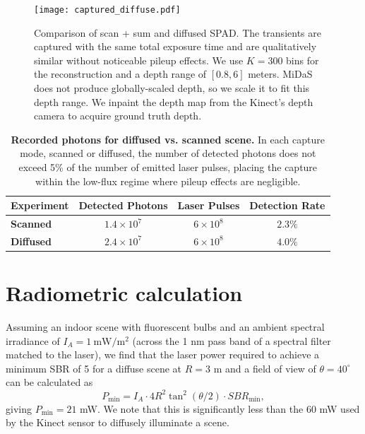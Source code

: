 \documentclass[runningheads]{llncs}
\begin{document}
\begin{figure}[ht!]
  \centering \texttt{[image: captured\_diffuse.pdf]}
  \caption{Comparison of scan + sum and diffused SPAD. The transients are captured
      with the same total exposure time and are qualitatively similar without 
      noticeable pileup effects. We use $K = 300$ bins for the reconstruction
      and a depth range of $[0.8, 6]$ meters. MiDaS \cite{Lasinger:2019} does
      not produce globally-scaled depth, so we scale it to fit this depth range.
      We inpaint the depth map from the Kinect's depth camera to acquire ground
      truth depth.}
  \label{fig:comparison}
\end{figure}

\begin{table}[ht!]
    \renewcommand{\arraystretch}{1.3}
    \setlength{\tabcolsep}{10pt}
     \centering
     \begin{tabular}{lccc} \toprule
         \textbf{Experiment} & \textbf{Detected Photons} & \textbf{Laser Pulses} & \textbf{Detection Rate} \\\hline
         \textbf{Scanned} & $1.4\times10^7$ & $6\times10^8$ & $2.3\%$ \\
         \textbf{Diffused} & $2.4\times10^7$ & $6\times10^8$ & $4.0\%$ \\
        \bottomrule
    \end{tabular}
    \vspace{0.4em}
    \caption{\textbf{Recorded photons for diffused vs. scanned scene.} In each capture mode, scanned or diffused, the number of detected photons does not exceed 5\% of the number of emitted laser pulses, placing the capture within the low-flux regime where pileup effects are negligible.}
    \label{tab:photon_counts}
\end{table}

\section{Radiometric calculation}
Assuming an indoor scene with fluorescent bulbs and an ambient spectral irradiance of $I_A =
1~\text{mW}/\text{m}^2$ (across the 1 nm pass band of a spectral filter matched
to the laser), we find that the laser power required to achieve a minimum SBR of
5 for a diffuse scene at $R = 3$ m and a field of view of
$\theta = 40^\circ$\textdegree can be calculated as
%
\begin{equation}
  P_{\text{min}} = I_A \cdot 4 R^2 \tan^2(\theta/2) \cdot SBR_{\text{min}},
\end{equation}
giving $P_{\text{min}}=21$ mW. We note that this is significantly
less than the 60 mW used by the Kinect sensor to diffusely illuminate a scene.
\end{document}
